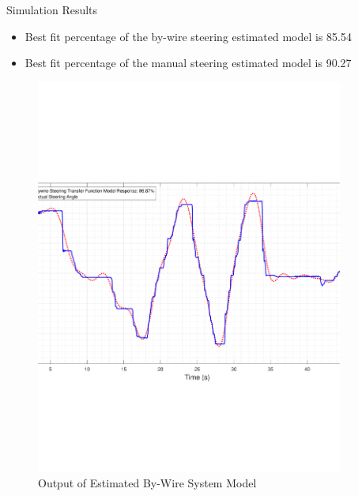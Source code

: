 \documentclass{beamer}
\begin{document}
\begin{frame}{Simulation Results}
  \begin{block}{}
 \begin{itemize}
	\item Best fit percentage of the by-wire steering estimated model is 85.54
	\item Best fit percentage of the manual steering estimated model is 90.27
 \end{itemize}
 \begin{figure}
    \centering
    \begin{minipage}{0.45\textwidth}
        \centering
        \includegraphics[width=0.9\textwidth]{figs/img/byWireSteeringTransferFunctionModel} %
        \caption{Output of Estimated By-Wire System Model}
        \label{fig:byWireSteerModel}
    \end{minipage}\hfill
    \begin{minipage}{0.45\textwidth}
        \centering

\end{minipage}
\end{figure}
\end{block}
\end{frame}
\end{document}
